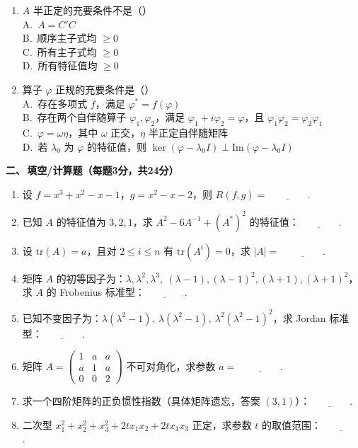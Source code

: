 \begin{enumerate}
    \item $A$ 半正定的充要条件不是（\quad）\\
          A.\ $A=C'C$ \\ 
          B.\ 顺序主子式均 $\ge 0$ \\ 
          C.\ 所有主子式均 $\ge 0$ \\ 
          D.\ 所有特征值均 $\ge 0$ \\ 

    \item 算子 $\varphi$ 正规的充要条件是（\quad）\\
          A.\ 存在多项式 $f$，满足 $\varphi^*=f(\varphi)$ \\ 
          B.\ 存在两个自伴随算子 $\varphi_1,\varphi_2$，满足 $\varphi_1+i\varphi_2=\varphi$，且 $\varphi_1\varphi_2=\varphi_2\varphi_1$ \\ 
          C.\ $\varphi=\omega\eta$，其中 $\omega$ 正交，$\eta$ 半正定自伴随矩阵 \\ 
          D.\ 若 $\lambda_0$ 为 $\varphi$ 的特征值，则 $\ker(\varphi-\lambda_0 I)\perp \mathrm{Im}(\varphi-\lambda_0 I)$
\end{enumerate}

\textbf{二、\,填空/计算题（每题3分，共24分）}

\begin{enumerate}
    \item 设 $f=x^3+x^2-x-1$，$g=x^2-x-2$，则 $R(f,g)=$$\underline{\qquad\qquad}$.

    \item 已知 $A$ 的特征值为 $3,2,1$，求 $A^2-6A^{-1}+(A^*)^2$ 的特征值：$\underline{\qquad\qquad}$.

    \item 设 $\mathrm{tr}(A)=a$，且对 $2\le i\le n$ 有 $\mathrm{tr}(A^i)=0$，求 $|A|=$ $\underline{\qquad\qquad}$.

    \item 矩阵 $A$ 的初等因子为：$\lambda,\lambda^2,\lambda^3,\ (\lambda-1),(\lambda-1)^2,(\lambda+1),(\lambda+1)^2$，求 $A$ 的 Frobenius 标准型：$\underline{\qquad\qquad}$.

    \item 已知不变因子为：$\lambda(\lambda^2-1),\ \lambda(\lambda^2-1),\ \lambda^2(\lambda^2-1)^2$，求 Jordan 标准型：$\underline{\qquad\qquad}$.

    \item 矩阵 $A=\begin{pmatrix}1&a&a\\a&1&a\\0&0&2\end{pmatrix}$ 不可对角化，求参数 $a=$ $\underline{\qquad\qquad}$.

    \item 求一个四阶矩阵的正负惯性指数（具体矩阵遗忘，答案 $(3,1)$）：$\underline{\qquad\qquad}$.

    \item 二次型 $x_1^2+x_2^2+x_3^2+2tx_1x_2+2tx_1x_3$ 正定，求参数 $t$ 的取值范围：$\underline{\qquad\qquad}$.
\end{enumerate}

